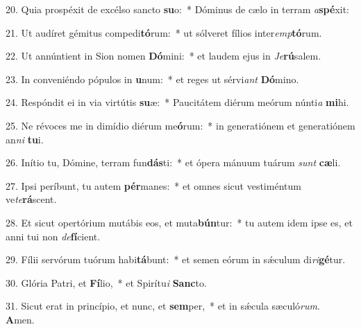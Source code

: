 20. Quia prospéxit de excélso sancto \textbf{su}o:~*  Dóminus de cælo in terram \textit{a}\textbf{spé}xit:\

21. Ut audíret gémitus compedi\textbf{tó}rum:~*  ut sólveret fílios inter\textit{emp}\textbf{tó}rum.\

22. Ut annúntient in Sion nomen \textbf{Dó}mini:~*  et laudem ejus in \textit{Je}\textbf{rú}salem.\

23. In conveniéndo pópulos in \textbf{u}num:~*  et reges ut sérvi\textit{ant} \textbf{Dó}mino.\

24. Respóndit ei in via virtútis \textbf{su}æ:~*  Paucitátem diérum meórum núnti\textit{a} \textbf{mi}hi.\

25. Ne révoces me in dimídio diérum me\textbf{ó}rum:~*  in generatiónem et generatiónem an\textit{ni} \textbf{tu}i.\

26. Inítio tu, Dómine, terram fun\textbf{dás}ti:~*  et ópera mánuum tuárum \textit{sunt} \textbf{cæ}li.\

27. Ipsi períbunt, tu autem \textbf{pér}manes:~*  et omnes sicut vestiméntum ve\textit{te}\textbf{rá}scent.\

28. Et sicut opertórium mutábis eos, et muta\textbf{bún}tur:~*  tu autem idem ipse es, et anni tui non \textit{de}\textbf{fí}cient.\

29. Fílii servórum tuórum habi\textbf{tá}bunt:~*  et semen eórum in sǽculum di\textit{ri}\textbf{gé}tur.\

30. Glória Patri, et \textbf{Fí}lio,~*  et Spirítu\textit{i} \textbf{Sanc}to.\

31. Sicut erat in princípio, et nunc, et \textbf{sem}per,~*  et in sǽcula sæculó\textit{rum}. \textbf{A}men.\

